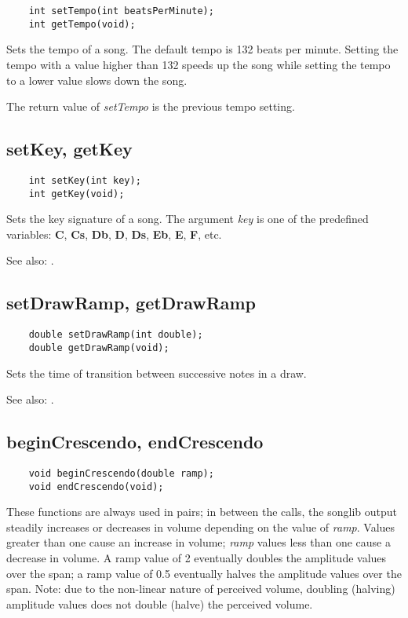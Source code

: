 \documentclass{article}
\begin{document}
\begin{verbatim}
    int setTempo(int beatsPerMinute);
    int getTempo(void);
\end{verbatim}

Sets the tempo of a song. The default tempo is 132 beats per minute.
Setting the tempo with a value higher than 132 speeds up the song while
setting the tempo to a lower value slows down the song.

The return value
of {\it setTempo} is the previous tempo setting.

\subsection*{setKey, getKey}

\begin{verbatim}
    int setKey(int key);
    int getKey(void);
\end{verbatim}

Sets the key signature of a song. The argument {\it key} is one of the
predefined variables:
{\bf C}, {\bf Cs}, {\bf Db}, {\bf D}, {\bf Ds}, {\bf Eb}, {\bf E}, {\bf F}, etc.

See also: .

\subsection{setDrawRamp, getDrawRamp}

\begin{verbatim}
    double setDrawRamp(int double);
    double getDrawRamp(void);
\end{verbatim}

Sets the time of transition between successive notes in a draw.

See also: .

\subsection*{beginCrescendo, endCrescendo}

\begin{verbatim}
    void beginCrescendo(double ramp);
    void endCrescendo(void);
\end{verbatim}

These functions are always used in pairs; in between the calls,
the songlib output steadily increases or decreases in volume depending
on the value of {\it ramp}. Values greater than one cause an
increase in volume; {\it ramp} values less than one cause
a decrease in volume. A ramp value of 2 eventually 
doubles the amplitude values
over the span; a ramp value of 0.5 eventually halves the amplitude
values over
the span.
Note: due to the non-linear nature of perceived volume,
doubling (halving) amplitude values does not double (halve)
the perceived volume.
\end{document}
